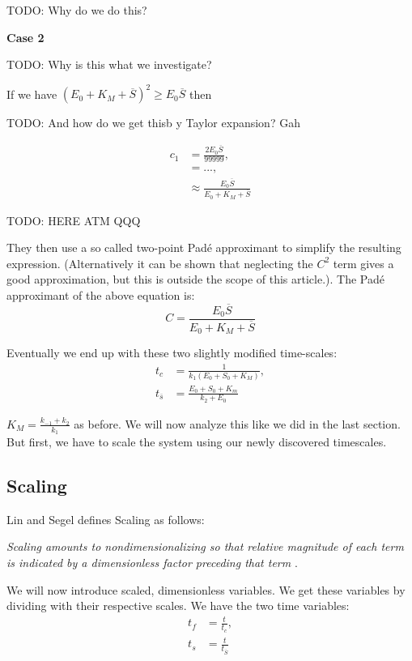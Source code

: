 \documentclass[12pt]{article}
\begin{document}
TODO: Why do we do this?

\textbf{Case 2}

TODO: Why is this what we investigate?

If we have $(E_0 + K_M + \overline{S})^2 \geq E_0 \overline{S}$ then

TODO: And how do we get thisb y Taylor expansion? Gah

\begin{align}
  c_1 &= \frac{2 E_0 \overline{S}}{99999}, \\
  &= ..., \\
  &\approx \frac{E_0 \overline{S}}{E_0 + K_M + \overline{S}}
\end{align}










TODO: HERE ATM QQQ

They then use a so called two-point Pad\'{e} approximant to simplify
the resulting expression. (Alternatively it can be shown that
neglecting the $C^2$ term gives a good approximation, but this is
outside the scope of this article.). The Pad\'{e} approximant of the
above equation is:
\begin{equation}
  C = \frac{E_0 \overline{S}}{E_0 + K_M + \overline{S}}
\end{equation}


Eventually we end up with these two slightly modified time-scales:
\begin{align}
t_c &= \frac{1}{k_1(E_0+S_0+K_M)}, \\
t_{\overline{s}} &= \frac{E_0+S_0+K_m}{k_2+E_0}
\end{align}

$K_M = \frac{k_{-1}+k_2}{k_1}$ as before. We will now analyze this
like we did in the last section. But first, we have to scale the
system using our newly discovered timescales.

\subsection{Scaling}

Lin and Segel defines Scaling as follows:

\textit{Scaling amounts to nondimensionalizing so that relative magnitude of
each term is indicated by a dimensionless factor preceding that term}
\cite{lin1974mathematics}.

We will now introduce scaled, dimensionless variables. We get these variables by
dividing with their respective scales. We have the two time variables:
\begin{align}
t_f &= \frac{t}{t_c}, \\
t_s &= \frac{t}{t_{\overline{S}}}
\end{align}
\end{document}
